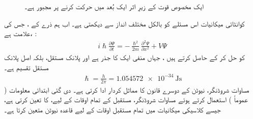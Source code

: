  \begin{figure}
 \centering
 \caption
{ایک مخصوص قوت کے زیرِ اثر  ایک بُعد میں حرکت کرنے پر مجبور ہے۔}
 \label{شکل_تفاعل_موج_حرکت_یک_بعدی}
 \end{figure}
کوانٹائی میکانیات اس مسئلے کو بالکل مختلف انداز سے دیکھتی ہے۔ اب ہم ذرے کے  ، جس کی علامت  ہے،  :
\begin{align}\label{مساوات_تفاعل_موج_شروڈنگر_الف}
 i \hslash \frac{\partial \Psi}{\partial t} = - \frac{\hslash^{2}}{2m} \frac{\partial^2 \Psi}{\partial x^{2}} + V \Psi
\end{align}
کو حل کر کے حاصل کرتے ہیں ، جہاں  منفی ایک  کا جذر ہے  اور  پلانک مستقل، بلکہ اصل پلانک مستقل تقسیم  ہے۔
\begin{align}
 \hslash = \frac{h}{2\pi} = \SI{1.054572e-34}{\joule\second} 
\end{align}
مساوات شروڈنگر،   نیوٹن کے دوسرے قانون کا مماثل کردار ادا کرتی ہے۔ دی گئی ابتدائی معلومات ( عموماً  )  استعمال کرتے ہوئے مساوات شروڈنگر، مستقبل کے تمام اوقات کے لیے،  کا تعین کرتی ہے، جیسے کلاسیکی میکانیات میں تمام مستقبل اوقات کے لیے قاعدہ نیوٹن  متعین کرتا ہے۔ 
 

